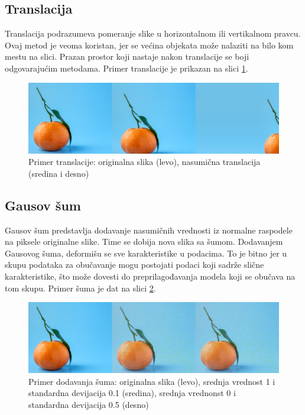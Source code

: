 \documentclass[12pt,oneside]{memoir}
\begin{document}
\subsection{Translacija}
Translacija podrazumeva pomeranje slike u horizontalnom ili vertikalnom pravcu. Ovaj metod je veoma koristan, jer se većina objekata može nalaziti na bilo kom mestu na slici. Prazan prostor koji nastaje nakon translacije se boji odgovarajućim metodama. Primer translacije je prikazan na slici \ref{fig:section3_trans}.

\begin{figure}[ht]
    \centering
    \includegraphics[width=1\textwidth]{matfmaster/glava3/translate.jpg}
    \caption{Primer translacije: originalna slika (levo), nasumična translacija (sredina i desno) \cite{unsplashOrange}}
    \label{fig:section3_trans}
\end{figure}

\subsection{Gausov šum}
Gausov šum predstavlja dodavanje nasumičnih vrednosti iz normalne raspodele na piksele originalne slike. Time se dobija nova slika sa šumom. Dodavanjem Gausovog šuma, deformišu se sve karakteristike u podacima. To je bitno jer u skupu podataka za obučavanje mogu postojati podaci koji sadrže slične karakteristike, što može dovesti do preprilagođavanja modela koji se obučava na tom skupu. Primer šuma je dat na slici \ref{fig:section3_noise}.

\begin{figure}[ht]
    \centering
    \includegraphics[width=1\textwidth]{matfmaster/glava3/noise.jpg}
    \caption{Primer dodavanja šuma:  originalna slika (levo), srednja vrednost 1 i standardna devijacija 0.1 (sredina), srednja vrednonst 0 i standardna devijacija 0.5 (desno) \cite{unsplashOrange}}
    \label{fig:section3_noise}
\end{figure}
\end{document}
